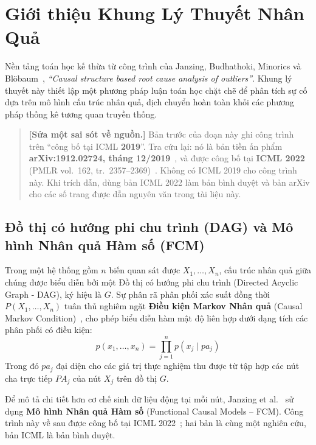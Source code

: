 \documentclass[11pt,a4paper]{article}
\begin{document}
\section{Giới thiệu Khung Lý Thuyết Nhân Quả}
\label{sec:khung}

Nền tảng toán học kế thừa từ công trình của Janzing, Budhathoki, Minorics và
Blöbaum~\cite{janzing2019rootcause}, \textit{``Causal structure based root cause
analysis of outliers''}. Khung lý thuyết này thiết lập một phương pháp luận toán học
chặt chẽ để phân tích sự cố dựa trên mô hình cấu trúc nhân quả, dịch chuyển hoàn toàn
khỏi các phương pháp thống kê tương quan truyền thống.

\begin{quote}
\small
\textbf{[Sửa một sai sót về nguồn.]} Bản trước của đoạn này ghi công trình trên
``công bố tại ICML \textbf{2019}''. Tra cứu lại: nó là bản tiền ấn phẩm
\textbf{arXiv:1912.02724, tháng 12/2019}~\cite{janzing2019rootcause}, và được công bố
tại \textbf{ICML 2022} (PMLR vol.~162, tr.~2357--2369)~\cite{budhathoki2022rootcause}.
Không có ICML 2019 cho công trình này. Khi trích dẫn, dùng bản ICML 2022 làm bản bình
duyệt và bản arXiv cho các số trang được dẫn nguyên văn trong tài liệu này.
\end{quote}

\subsection{Đồ thị có hướng phi chu trình (DAG) và Mô hình Nhân quả Hàm số (FCM)}

Trong một hệ thống gồm $n$ biến quan sát được $X_1, \dots, X_n$, cấu trúc nhân quả giữa chúng được biểu diễn bởi một Đồ thị có hướng phi chu trình (Directed Acyclic Graph - DAG), ký hiệu là $G$. Sự phân rã phân phối xác suất đồng thời $P(X_1, \dots, X_n)$ tuân thủ nghiêm ngặt \textbf{Điều kiện Markov Nhân quả} (Causal Markov Condition)~\cite{pearl2009causality}, cho phép biểu diễn hàm mật độ liên hợp dưới dạng tích các phân phối có điều kiện:
\begin{equation}
p(x_1, \dots, x_n) = \prod_{j=1}^n p(x_j \mid pa_j)
\end{equation}
Trong đó $pa_j$ đại diện cho các giá trị thực nghiệm thu được từ tập hợp các nút cha trực tiếp $PA_j$ của nút $X_j$ trên đồ thị $G$.

Để mô tả chi tiết hơn cơ chế sinh dữ liệu động tại mỗi nút, Janzing et al.~\cite{janzing2019rootcause} sử dụng \textbf{Mô hình Nhân quả Hàm số} (Functional Causal Models -- FCM). Công trình này về sau được công bố tại ICML 2022~\cite{budhathoki2022rootcause}; hai bản là cùng một nghiên cứu, bản ICML là bản bình duyệt.
\end{document}
